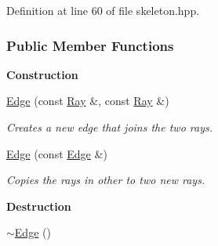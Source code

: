 Definition at line 60 of file skeleton.\+hpp.

\subsubsection*{Public Member Functions}
\begin{Indent}\textbf{ Construction}\par
\begin{DoxyCompactItemize}
\item 
\mbox{\label{group___c_l_s_solvers_a0e0d55af1b62a30f927d22a4d4a606aa}} 
\hyperlink{group___c_l_s_solvers_a0e0d55af1b62a30f927d22a4d4a606aa}{Edge} (const \hyperlink{group___c_l_s_solvers_class_l_p___solvers_1_1_ray}{Ray} \&, const \hyperlink{group___c_l_s_solvers_class_l_p___solvers_1_1_ray}{Ray} \&)
\begin{DoxyCompactList}\small\item\em Creates a new edge that joins the two rays. \end{DoxyCompactList}\item 
\mbox{\label{group___c_l_s_solvers_a057b073d9eb422d71f083f2422eafcef}} 
\hyperlink{group___c_l_s_solvers_a057b073d9eb422d71f083f2422eafcef}{Edge} (const \hyperlink{group___c_l_s_solvers_class_l_p___solvers_1_1_edge}{Edge} \&)
\begin{DoxyCompactList}\small\item\em Copies the rays in {\ttfamily other} to two new rays. \end{DoxyCompactList}\end{DoxyCompactItemize}
\end{Indent}
\begin{Indent}\textbf{ Destruction}\par
\begin{DoxyCompactItemize}
\item 
\hyperlink{group___c_l_s_solvers_a752de1869e522b7b7a1eb9ef67664c9f}{$\sim$\+Edge} ()
\end{DoxyCompactItemize}
\end{Indent}
